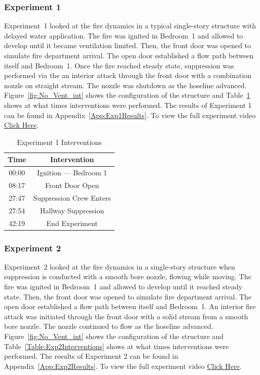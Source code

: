 \documentclass[12pt,oneside]{book}
\begin{document}
\subsubsection{Experiment 1}
Experiment~1 looked at the fire dynamics in a typical single-story structure with delayed water application. The fire was ignited in Bedroom~1 and allowed to develop until it became ventilation limited. Then, the front door was opened to simulate fire department arrival. The open door established a flow path between itself and Bedroom~1. Once the fire reached steady state, suppression was performed via the an interior attack through the front door with a combination nozzle on straight stream. The nozzle was shutdown as the hoseline advanced. Figure~\ref{fig:No_Vent_int} shows the configuration of the structure and Table~\ref{Table:Exp1Interventions} shows at what times interventions were performed. The results of Experiment 1 can be found in Appendix~\ref{App:Exp1Results}. To view the full experiment video \href{https://player.vimeo.com/video/170499605?autoplay=1}{Click Here}.

\begin{table}[!ht]
	\centering
	\caption{Experiment 1 Interventions}
	\begin{tabular}{|c|c|} 
		\hline
		Time & Intervention \\ \hline \hline
		00:00 & Ignition --- Bedroom 1 \\ \hline
		08:17 & Front Door Open \\ \hline
		27:47 & Suppression Crew Enters\\ \hline
		27:54 & Hallway Suppression \\ \hline
		42:19 & End Experiment\\ \hline
	\end{tabular}
	\label{Table:Exp1Interventions}
\end{table}

\FloatBarrier

\subsubsection{Experiment 2}

Experiment~2 looked at the fire dynamics in a single-story structure when suppression is conducted with a smooth bore nozzle, flowing while moving. The fire was ignited in Bedroom~1 and allowed to develop until it reached steady state. Then, the front door was opened to simulate fire department arrival. The open door established a flow path between itself and Bedroom~1. An interior fire attack was initiated through the front door with a solid stream from a smooth bore nozzle. The nozzle continued to flow as the hoseline advanced. Figure~\ref{fig:No_Vent_int} shows the configuration of the structure and Table~\ref{Table:Exp2Interventions} shows at what times interventions were performed. The results of Experiment 2 can be found in Appendix~\ref{App:Exp2Results}. To view the full experiment video \href{https://player.vimeo.com/video/170510934?autoplay=1}{Click Here}.
\end{document}
